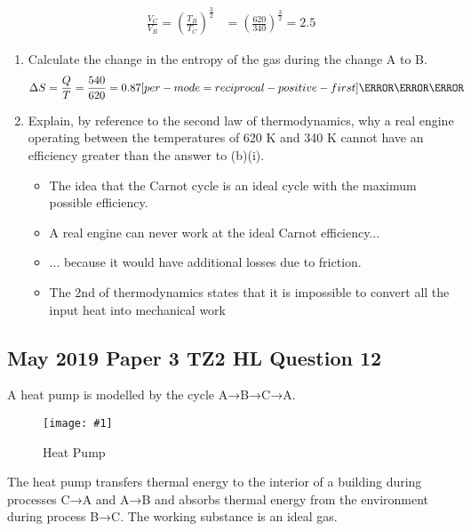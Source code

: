 \documentclass[a4paper,12pt]{article}
\let\oldsi\si
\renewcommand{\si}[1]{\oldsi[per-mode=reciprocal-positive-first]{#1}}
\newcommand{\img}[4]{\begin{center}
  \begin{figure}[H]
    \centering
    \texttt{[image: \#1]}
    \caption{#3}
    \label{fig:#4}
  \end{figure}
\end{center}}
\begin{document}
\begin{enumerate}[label=(\alph*)]
\begin{enumerate}[label=(\roman*)]
\begin{align*}
                  \frac{V_C}{V_B} = \left(\frac{T_B}{T_C}\right)^\frac{3}{2} & = \left(\frac{620}{340}\right)^\frac{3}{2} = 2.5
                \end{align*}
        \end{enumerate}
        \begin{enumerate}[label=(\roman*)]
          \item Calculate the change in the entropy of the gas during the change A to B.
                \begin{align*}
                  \Delta S & = \frac{Q}{T} = \frac{540}{620} = 0.87\si{\joule\per\kelvin}
                \end{align*}
          \item Explain, by reference to the second law of thermodynamics, why a real engine
                operating between the temperatures of 620 K and 340 K cannot have an
                efficiency greater than the answer to (b)(i).
                \begin{itemize}
                  \item The idea that the Carnot cycle is an ideal cycle with the maximum possible efficiency.
                  \item A real engine can never work at the ideal Carnot efficiency...
                  \item ... because it would have additional losses due to friction.
                  \item The 2nd of thermodynamics states that it is impossible to
                        convert all the input heat into mechanical work
                \end{itemize}
        \end{enumerate}

\end{enumerate}


\subsection{May 2019 Paper 3 TZ2 HL Question 12}

A heat pump is modelled by the cycle A→B→C→A.

\img{ex/5.png}{0.5}{Heat Pump}{ex5}

The heat pump transfers thermal energy to the interior of a building during processes
C→A and A→B and absorbs thermal energy from the environment during process B→C.
The working substance is an ideal gas.
\end{document}
